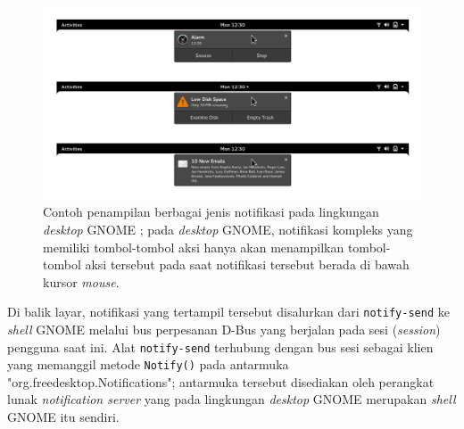 \begin{figure}
    \centering
    \includegraphics[width=1\linewidth]{assets/banners-expanded.png}
    \caption{Contoh penampilan berbagai jenis notifikasi pada lingkungan \textit{desktop} GNOME \cite{gnome-hig-notifications}; pada \textit{desktop} GNOME, notifikasi kompleks yang memiliki tombol-tombol aksi hanya akan menampilkan tombol-tombol aksi tersebut pada saat notifikasi tersebut berada di bawah kursor \textit{mouse}.}
    \label{example-of-notification-with-action-buttons-on-gnome-desktop}
\end{figure}

Di balik layar, notifikasi yang tertampil tersebut disalurkan dari \verb|notify-send| ke \textit{shell} GNOME melalui bus perpesanan D-Bus yang berjalan pada sesi (\textit{session}) pengguna saat ini. Alat \verb|notify-send| terhubung dengan bus sesi sebagai klien yang memanggil metode \verb|Notify()| pada antarmuka "org.freedesktop.Notifications"; antarmuka tersebut disediakan oleh perangkat lunak \textit{notification server} yang pada lingkungan \textit{desktop} GNOME merupakan \textit{shell} GNOME itu sendiri.


